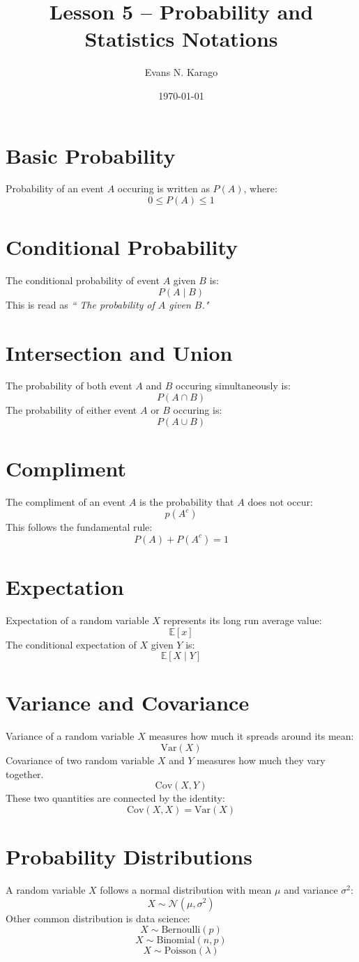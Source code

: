 \documentclass[11pt]{article}
\title{Lesson 5 -- Probability and Statistics Notations}
\author{Evans N. Karago}
\date{\today}
\begin{document}
\maketitle
\section*{Basic Probability}
Probability of an event $A$ occuring is written as $P(A)$, where:
\[
0 \leq P(A) \leq 1
\]
\section*{Conditional Probability}
The conditional probability of event $A$ given $B$ is:
\[
P(A \mid B)
\]
This is read as \textit{`` The probability of $A$ given $B$."}
\section*{Intersection and Union}
The probability of both event $A$ and $B$ occuring simultaneously is:
\[
P(A \cap B) 
\]
The probability of either event $A$ or $B$ occuring is:
\[
P(A \cup B)
\]
\section*{Compliment}
The compliment of an event $A$ is the probability that $A$ does not occur:
\[
p(A^c)
\]
This follows the fundamental rule:
\[
P(A) + P(A^c) = 1
\]
\section*{Expectation}
Expectation of a random variable $X$ represents its long run average value: 
\[
\mathbb{E}[x]
\]
The conditional expectation of $X$ given $Y$ is:
\[
\mathbb{E}[X \mid Y]
\]
\section*{Variance and Covariance}
Variance of a random variable $X$ measures how much it spreads around its mean:
\[
\text{Var}(X)
\]
Covariance of two random variable $X$ and $Y$ measures how much they vary together.
\[
\text{Cov}(X, Y)
\]
These two quantities are connected by the identity:
\[
\text{Cov}(X, X) = \text{Var}(X)
\]
\section*{Probability Distributions}
A random variable $X$ follows a normal distribution with mean $\mu$ and variance $\sigma^2$:
\[
X \sim \mathcal{N}(\mu, \sigma^2)
\]
Other common distribution is data science:
\[
X \sim \text{Bernoulli}(p)
\]
\[
X \sim \text{Binomial}(n, p)
\]
\[
X \sim \text{Poisson}(\lambda)
\]
\end{document}
